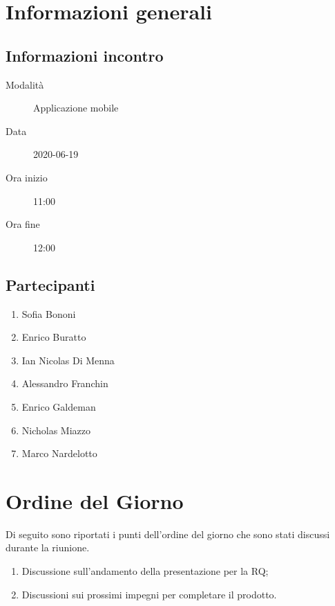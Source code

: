 \documentclass{article}
\begin{document}


\section{Informazioni generali}%
\label{sec:informazioni_generali}

\subsection{Informazioni incontro}%
\label{sub:informazioni_incontro}

\begin{description}
  \item[Modalità] Applicazione mobile 
  \item[Data] 2020-06-19
  \item[Ora inizio] 11:00
  \item[Ora fine] 12:00
\end{description}

\subsection{Partecipanti}%
\label{sub:partecipanti}

\begin{enumerate}
  \item Sofia Bononi
  \item Enrico Buratto
  \item Ian Nicolas Di Menna
  \item Alessandro Franchin
  \item Enrico Galdeman
  \item Nicholas Miazzo
  \item Marco Nardelotto
\end{enumerate}

\section{Ordine del Giorno}%
\label{ordine_del_giorno}
Di seguito sono riportati i punti dell'ordine del giorno che sono stati discussi durante la riunione.
\begin{enumerate}
  \item Discussione sull'andamento della presentazione per la RQ;
  \item Discussioni sui prossimi impegni per completare il prodotto.
\end{enumerate}
\end{document}
